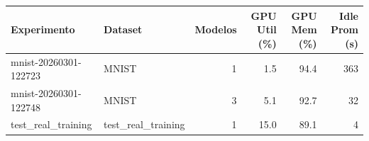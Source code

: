 \begin{tabular}{llrrrr}
\toprule
Experimento & Dataset & Modelos & GPU Util (\%) & GPU Mem (\%) & Idle Prom (s) \\
\midrule
mnist-20260301-122723 & MNIST & 1 & 1.5 & 94.4 & 363 \\
mnist-20260301-122748 & MNIST & 3 & 5.1 & 92.7 & 32 \\
test_real_training & test_real_training & 1 & 15.0 & 89.1 & 4 \\
\bottomrule
\end{tabular}